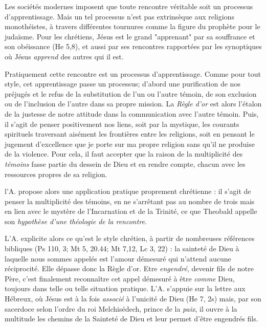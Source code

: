  Les sociétés modernes imposent que toute rencontre véritable soit un processus d'apprentissage. Mais un tel processus n'est pas extrinsèque aux religions monothéistes, à travers différentes tournures  comme la figure du prophète pour le judaïsme. Pour les chrétiens, Jésus est le grand "apprenant" par sa souffrance et son obéissance (He 5,8), et  aussi par ses rencontres rapportées par les synoptiques où Jésus \textit{apprend} des autres qui il est.  

{Pratiquement cette rencontre est un processus d'apprentissage.} Comme pour tout style, cet apprentissage passe un processus; d'abord une purification de nos préjugés et le refus de la substitution de l'un ou l'autre témoin, de son exclusion ou de l'inclusion de l'autre dans sa propre mission. La \textit{Règle d'or} est alors l'étalon de la justesse de notre attitude dans la communication avec l'autre témoin. Puis, il s'agit de penser positivement nos liens, soit par la mystique, les courants spirituels traversant aisément les frontières entre les religions,  soit en pensant le jugement d'excellence que je porte sur ma propre religion sans qu'il ne produise de la violence. Pour cela, il faut  accepter que la raison de la multiplicité des \textit{témoins} fasse partie du dessein de Dieu et en rendre compte, chacun avec les ressources propres de sa religion. 

 
l'A. propose alors une application pratique proprement chrétienne : il s'agit de penser la multiplicité des témoins, en ne s'arrêtant pas au nombre de trois mais en lien avec le mystère de l'Incarnation et de la Trinité, ce que Theobald appelle son \textit{hypothèse d'une théologie de la rencontre}. 
 


 L'A. explicite alors ce qu'est le style chrétien, à partir de nombreuses références bibliques (Ps 110, 3; Mt 5, 20.44; Mt 7,12, Lc 3, 22) : la sainteté de Dieu à laquelle nous sommes appelés est l'amour démesuré qui n'attend aucune réciprocité. Elle dépasse donc la Règle d'or. Etre\textit{ engendré}, devenir fils de notre Père, c'est finalement reconnaître  cet appel démesuré à être \textit{comme} Dieu, toujours dans telle ou telle situation pratique. L'A. s'appuie sur la lettre aux Hébreux, où Jésus est à la fois \textit{associé} à l'unicité de Dieu (He 7, 2s) mais, par son sacerdoce selon l'ordre du roi Melchisédech, prince de la \textit{paix}, il ouvre à la multitude les chemins de la Sainteté de Dieu et leur permet d'être engendrés fils. 

